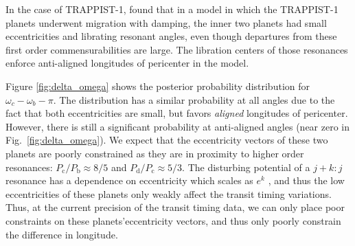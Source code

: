 \documentclass[twocolumn]{aastex63}
\begin{document}


In the case of TRAPPIST-1, \citet{Papaloizou2017} found that in a model
in which the TRAPPIST-1 planets underwent migration with damping, the
inner two planets had small eccentricities and librating resonant angles,
even though departures from these first order commensurabilities are
large.  The libration centers of those resonances enforce anti-aligned longitudes 
of pericenter in the model.

Figure \ref{fig:delta_omega} shows the posterior probability distribution
for $\omega_c-\omega_b-\pi$.   The distribution has a similar probability
at all angles due to the fact that both eccentricities are small, but 
favors {\it aligned} longitudes of pericenter.  However,
there is still a significant probability at anti-aligned angles (near
zero in Fig.\ \ref{fig:delta_omega}).   We expect that the eccentricity vectors
of these two planets are poorly constrained as they are in proximity
to higher order resonances: $P_\mathrm{c}/P_\mathrm{b} {\approx} 8/5$ and $P_\mathrm{d}/P_\mathrm{c} \approx
5/3$.  The disturbing potential of a $j{+}k{:}j$ resonance has a dependence on 
eccentricity which scales as $e^k$ \citep{Deck2016}, and thus the low eccentricities of 
these planets only weakly affect the transit timing variations.  Thus, at 
the current precision of the transit timing data, we can only place poor 
constraints on these planets'eccentricity vectors, and thus only poorly constrain
the difference in longitude.
\end{document}
